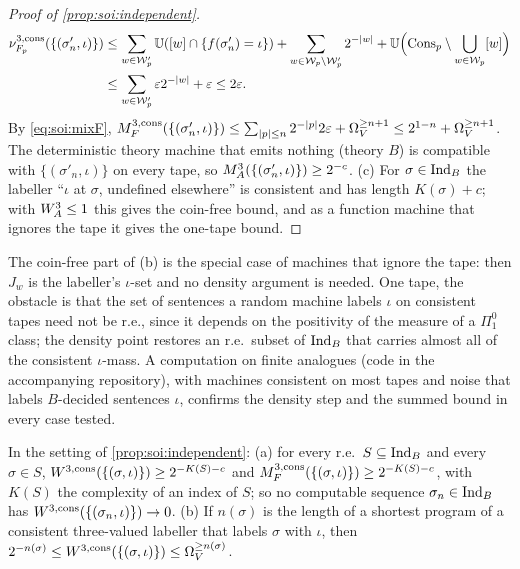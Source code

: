\begin{proof}[Proof of \cref{prop:soi:independent}]
\begin{align*}
\nu^{3,\mathrm{cons}}_{F_p}(\{(\sigma'_n,\iota)\})&\le\sum_{w\in\mathcal W'_p}\mathbb{U}([w]\cap\{f(\sigma'_n)=\iota\})+\sum_{w\in\mathcal W_p\setminus\mathcal W'_p}2^{-\lvert w\rvert}+\mathbb{U}\Big(\mathrm{Cons}_p\setminus\bigcup_{w\in\mathcal W_p}[w]\Big)\\
&\le\sum_{w\in\mathcal W'_p}\varepsilon2^{-\lvert w\rvert}+\varepsilon\le2\varepsilon.
\end{align*}
By \eqref{eq:soi:mixF}, $M_{F}^{3,\mathrm{cons}}(\{(\sigma'_n,\iota)\})\le\sum_{\lvert p\rvert\le n}2^{-\lvert p\rvert}2\varepsilon+\Omega_{V}^{\ge n+1}\le2^{1-n}+\Omega_{V}^{\ge n+1}$. The deterministic theory machine that emits nothing (theory $B$) is compatible with $\{(\sigma'_n,\iota)\}$ on every tape, so $M_{A}^{3}(\{(\sigma'_n,\iota)\})\ge2^{-c}$.
(c) For $\sigma\in\mathrm{Ind}_{B}$ the labeller ``$\iota$ at $\sigma$, undefined elsewhere'' is consistent and has length $K(\sigma)+c$; with $W_{A}^{3}\le1$ this gives the coin-free bound, and as a function machine that ignores the tape it gives the one-tape bound.
\end{proof}

The coin-free part of (b) is the special case of machines that ignore the tape: then $J_w$ is the labeller's $\iota$-set and no density argument is needed. One tape, the obstacle is that the set of sentences a random machine labels $\iota$ on consistent tapes need not be r.e., since it depends on the positivity of the measure of a $\Pi^0_1$ class; the density point restores an r.e.\ subset of $\mathrm{Ind}_{B}$ that carries almost all of the consistent $\iota$-mass. A computation on finite analogues (code in the accompanying repository), with machines consistent on most tapes and noise that labels $B$-decided sentences $\iota$, confirms the density step and the summed bound in every case tested.

\begin{proposition}\label{prop:soi:noRE}
In the setting of \cref{prop:soi:independent}: (a) for every r.e.\ $S\subseteq\mathrm{Ind}_{B}$ and every $\sigma\in S$, $W^{3,\mathrm{cons}}(\{(\sigma,\iota)\})\ge2^{-K(S)-c}$ and $M_{F}^{3,\mathrm{cons}}(\{(\sigma,\iota)\})\ge2^{-K(S)-c}$, with $K(S)$ the complexity of an index of $S$; so no computable sequence $\sigma_n\in\mathrm{Ind}_{B}$ has $W^{3,\mathrm{cons}}(\{(\sigma_n,\iota)\})\to0$. (b) If $n(\sigma)$ is the length of a shortest program of a consistent three-valued labeller that labels $\sigma$ with $\iota$, then $2^{-n(\sigma)}\le W^{3,\mathrm{cons}}(\{(\sigma,\iota)\})\le\Omega_{V}^{\ge n(\sigma)}$.
\end{proposition}

